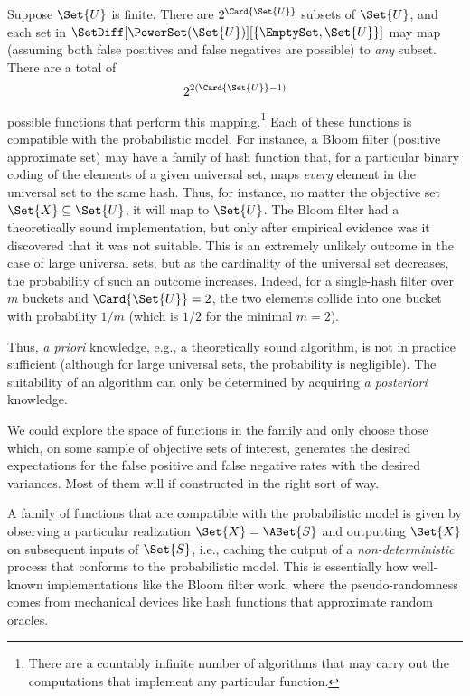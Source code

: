 \documentclass[ ../main.tex]{subfiles}
\begin{document}
Suppose $\Set{U}$ is finite. There are $2^{\Card{\Set{U}}}$ subsets of
$\Set{U}$, and each set in $\SetDiff[\PowerSet(\Set{U})][\{\EmptySet,\Set{U}\}]$ 
may map (assuming both false positives and false negatives are possible) to
\emph{any} subset. There are a total of
\begin{equation}
    2^{2(\Card{\Set{U}} - 1)}
\end{equation}
possible functions that perform this
mapping.\footnote{There are a countably infinite number of 
algorithms that may carry out the computations that 
implement any particular function.} Each of these functions 
is compatible with the probabilistic model. For instance, a 
Bloom filter (positive approximate set) may have a family of 
hash function that, for a particular binary coding of the 
elements of a given universal set, maps \emph{every} element 
in the universal set to the same hash. Thus, for instance, no 
matter the objective set $\Set{X} \subseteq \Set{U}$, it will 
map to $\Set{U}$. The Bloom filter had a theoretically sound 
implementation, but only after empirical evidence was it 
discovered that it was not suitable. This is an extremely
unlikely outcome in the case of large universal sets, but as
the cardinality of the universal set decreases, the
probability of such an outcome increases. Indeed, for a
single-hash filter over $m$ buckets and $\Card{\Set{U}} = 2$,
the two elements collide into one bucket with probability
$1/m$ (which is $1/2$ for the minimal $m = 2$).

Thus, \emph{a priori} knowledge, e.g., a theoretically sound 
algorithm, is not in practice sufficient (although for large 
universal sets, the probability is negligible). The 
suitability of an algorithm can only be determined by
acquiring \emph{a posteriori} knowledge.

We could explore the space of functions in the family and 
only choose those which, on some sample of objective sets of 
interest, generates the desired expectations for the false 
positive and false negative rates with the desired variances. 
Most of them will if constructed in the right sort of way.


A family of functions that are compatible with the 
probabilistic model is given by observing a particular 
realization $\Set{X} = \ASet{S}$ and outputting 
$\Set{X}$ on subsequent inputs of $\Set{S}$, i.e., caching 
the output of a \emph{non-deterministic} process that 
conforms to the probabilistic model. This is essentially how 
well-known implementations like the Bloom filter work, where 
the pseudo-randomness comes from mechanical devices like hash 
functions that approximate random oracles.
\end{document}
